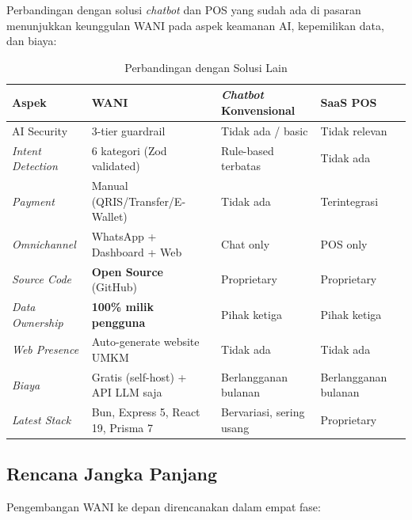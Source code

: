 \documentclass[12pt,a4paper,oneside]{article}
\newcommand{\sub}[1]{%
    \subsection{#1}%
}
\begin{document}
\noindent
Perbandingan dengan solusi \textit{chatbot} dan POS yang sudah ada di pasaran menunjukkan keunggulan WANI pada aspek keamanan AI, kepemilikan data, dan biaya:

\begin{table}[H]
	\centering
	\caption{Perbandingan dengan Solusi Lain}
	\label{tab:perbandingan}
	\begin{tabularx}{\textwidth}{p{3cm}Xp{3.5cm}p{2.5cm}}
		\toprule
		\textbf{Aspek}            & \textbf{WANI}                      & \textit{Chatbot} \textbf{Konvensional} & \textbf{SaaS POS}    \\
		\midrule
		AI Security               & 3-tier guardrail                   & Tidak ada / basic                      & Tidak relevan        \\
		\textit{Intent Detection} & 6 kategori (Zod validated)         & Rule-based terbatas                    & Tidak ada            \\
		\textit{Payment}          & Manual (QRIS/Transfer/E-Wallet)    & Tidak ada                              & Terintegrasi         \\
		\textit{Omnichannel}      & WhatsApp + Dashboard + Web         & Chat only                              & POS only             \\
		\textit{Source Code}      & \textbf{Open Source} (GitHub)      & Proprietary                            & Proprietary          \\
		\textit{Data Ownership}   & \textbf{100\% milik pengguna}      & Pihak ketiga                           & Pihak ketiga         \\
		\textit{Web Presence}     & Auto-generate website UMKM         & Tidak ada                              & Tidak ada            \\
		\textit{Biaya}            & Gratis (self-host) + API LLM saja  & Berlangganan bulanan                   & Berlangganan bulanan \\
		\textit{Latest Stack}     & Bun, Express 5, React 19, Prisma 7 & Bervariasi, sering usang               & Proprietary          \\
		\bottomrule
	\end{tabularx}
\end{table}

\sub{Rencana Jangka Panjang}

Pengembangan WANI ke depan direncanakan dalam empat fase:
\end{document}
